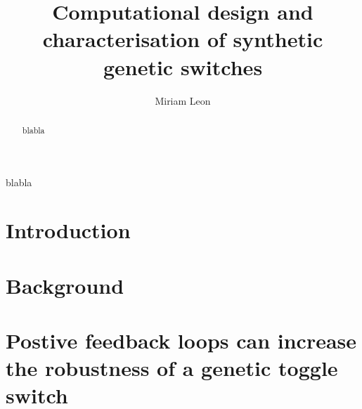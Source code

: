 \documentclass[]{phdthesis}
\title{Computational design and\\[0.2em]characterisation of synthetic\\[0.2em] genetic switches}
\author{Miriam Leon}
\begin{document}
\maketitle


\begin{abstract}
blabla
\end{abstract}

\tableofcontents*
\listoffigures
\listoftables
{}

\printglossary[type=\acronymtype, title=Abbreviations, toctitle=List of abbreviations]


\begin{acknowledgements}
blabla
\end{acknowledgements}


\mainmatter*
\chapter{Introduction}
\label{ch:Intro}


\mainmatter*
\chapter{Background}
\label{ch:backg}



%

\mainmatter*
\chapter{Postive feedback loops can increase the robustness of a genetic toggle switch}
\label{ch:abcsysbio}

\end{document}
